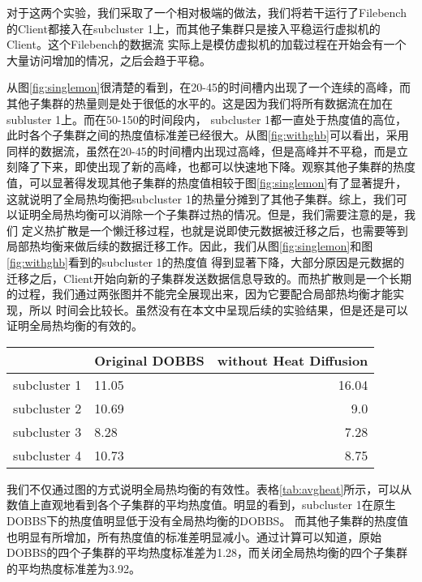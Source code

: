 对于这两个实验，我们采取了一个相对极端的做法，我们将若干运行了Filebench的Client都接入在subcluster 1上，而其他子集群只是接入平稳运行虚拟机的Client。这个Filebench的数据流
实际上是模仿虚拟机的加载过程在开始会有一个大量访问增加的情况，之后会趋于平稳。

从图\ref{fig:singlemon}很清楚的看到，在20-45的时间槽内出现了一个连续的高峰，而其他子集群的热量则是处于很低的水平的。这是因为我们将所有数据流在加在subluster 1上。而在50-150的时间段内，
subcluster 1都一直处于热度值的高位，此时各个子集群之间的热度值标准差已经很大。从图\ref{fig:withghb}可以看出，采用同样的数据流，虽然在20-45的时间槽内出现过高峰，但是高峰并不平稳，而是立
刻降了下来，即使出现了新的高峰，也都可以快速地下降。观察其他子集群的热度值，可以显著得发现其他子集群的热度值相较于图\ref{fig:singlemon}有了显著提升，这就说明了全局热均衡把subcluster 1的热量分摊到了其他子集群。综上，我们可以证明全局热均衡可以消除一个子集群过热的情况。但是，我们需要注意的是，我们
定义热扩散是一个懒迁移过程，也就是说即使元数据被迁移之后，也需要等到局部热均衡来做后续的数据迁移工作。因此，我们从图\ref{fig:singlemon}和图\ref{fig:withghb}看到的subcluster 1的热度值
得到显著下降，大部分原因是元数据的迁移之后，Client开始向新的子集群发送数据信息导致的。而热扩散则是一个长期的过程，我们通过两张图并不能完全展现出来，因为它要配合局部热均衡才能实现，所以
时间会比较长。虽然没有在本文中呈现后续的实验结果，但是还是可以证明全局热均衡的有效的。

\begin{table}
    \centering
    \begin{tabular}{@{}llr@{}} \toprule
       & Original DOBBS & without Heat Diffusion\\ \midrule
      subcluster 1 & 11.05 & 16.04 \\
      subcluster 2 & 10.69 & 9.0 \\
      subcluster 3 & 8.28 & 7.28 \\
      subcluster 4 & 10.73 & 8.75 \\
    \end{tabular}
\end{table}

我们不仅通过图的方式说明全局热均衡的有效性。表格\ref{tab:avgheat}所示，可以从数值上直观地看到各个子集群的平均热度值。明显的看到，subcluster 1在原生DOBBS下的热度值明显低于没有全局热均衡的DOBBS。
而其他子集群的热度值也明显有所增加，所有热度值的标准差明显减小。通过计算可以知道，原始DOBBS的四个子集群的平均热度标准差为1.28，而关闭全局热均衡的四个子集群的平均热度标准差为3.92。

